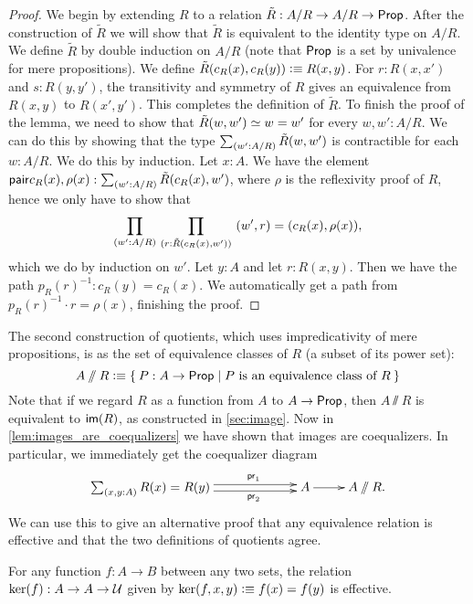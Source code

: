\begin{proof}
We begin by extending $R$ to a relation $\tilde{R}:A/R\to A/R\to\mathsf{Prop}$. After
the construction of $\tilde{R}$ we will show that $\tilde{R}$ is equivalent
to the identity type on $A/R$. We define $\tilde{R}$ by double induction on
$A/R$ (note that $\mathsf{Prop}$ is a set by univalence for mere propositions). We
define $\tilde{R}(c_R(x),c_R(y)) \vcentcolon\equiv R(x,y)$. For $r:R(x,x')$ and $s:R(y,y')$,
the transitivity and symmetry 
of $R$ gives an equivalence from $R(x,y)$ to $R(x',y')$. This completes the
definition of $\tilde{R}$. To finish the proof of the lemma, we need
to show that $\tilde{R}(w,w')\simeq w= w'$ for every $w,w':A/R$. We can
do this by showing that the type $\sm{w':A/R} \tilde{R}(w,w')$ is contractible for
each $w:A/R$. We do this by induction. Let $x:A$. We have the element
$\pair{c_R(x),\rho(x)}:\sm{w':A/R} \tilde{R}(c_R(x),w')$, where $\rho$ is
the reflexivity proof of $R$, hence we only
have to show that
\begin{equation*}
\prd{w':A/R}{r:\tilde{R}(c_R(x),w')} \pairr{w',r}=\pairr{c_R(x),\rho(x)},
\end{equation*}
which we do by induction on $w'$. Let $y:A$ and let $r:R(x,y)$. Then we have
the path $p_R(r)^{-1}:c_R(y)= c_R(x)$. We automatically get a path from
$p_R(r)^{-1}\cdot r=\rho(x)$, finishing the proof.
\end{proof}

The second construction of quotients, which uses impredicativity of mere propositions, is as the set of equivalence classes of $R$ (a subset
of its power set):
\[ A\sslash R \defeq \setof{ P:A\to\prop | P \text{ is an equivalence class of } R} \]
Note that if we regard $R$ as a function from $A$ to $A\to \mathsf{Prop}$, then $A\sslash R$ is equivalent to $\mathsf{im}(R)$, as constructed in \autoref{sec:image}.
Now in \autoref{lem:images_are_coequalizers} we have shown that images are
coequalizers. In particular, we immediately get the coequalizer diagram
\begin{equation*}
  \xymatrix{
    **[l]{\sm{x,y:A} R (x)= R (y)}
    \ar@<0.25em>[r]^{\proj1}
    \ar@<-0.25em>[r]_{\proj2}
    &
    {A}
    \ar[r]
    &
    {A \sslash R.}
  }
\end{equation*}
We can use this to give an alternative proof that any equivalence relation is effective and that the two definitions of quotients agree.

\begin{thm}\label{prop:kernels_are_effective}
For any function $f:A\to B$ between any two sets, 
the relation $\ker(f):A\to A\to\mathcal{U}$ given by 
$\ker(f,x,y)\vcentcolon\equiv f(x)= f(y)$ is effective. 
\end{thm}

